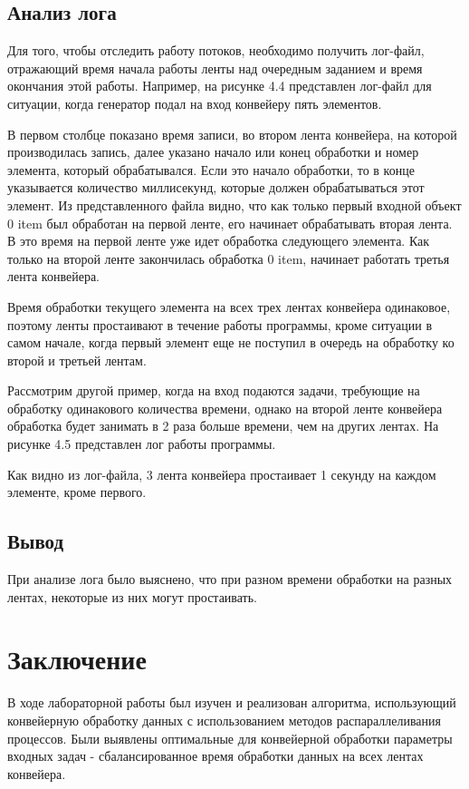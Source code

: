 \documentclass[a4paper,12pt]{report}
\begin{document}
\section{Анализ лога}

\hspace{0.6cm}Для того, чтобы отследить работу потоков, необходимо получить лог-файл, отражающий время начала работы ленты над очередным заданием и время окончания этой работы. 
Например, на рисунке 4.4 представлен лог-файл для ситуации, когда генератор подал на вход конвейеру пять элементов.



\hspace{0.6cm}В первом столбце показано время записи, во втором лента конвейера, на которой производилась запись, далее указано начало или конец обработки и номер элемента, который обрабатывался. Если это начало обработки, то в конце указывается количество миллисекунд, которые должен обрабатываться этот элемент. Из представленного файла видно, что как только первый входной объект 0 item был обработан на первой ленте, его начинает обрабатывать вторая лента. В это время на первой ленте уже идет обработка следующего элемента. Как только на второй ленте закончилась обработка 0 item, начинает работать третья лента конвейера. 

Время обработки текущего элемента на всех трех лентах конвейера одинаковое,  поэтому ленты простаивают в течение работы программы, кроме ситуации в самом начале, когда первый элемент еще не поступил в очередь на обработку ко второй и третьей лентам. 

Рассмотрим другой пример, когда на вход подаются задачи, требующие на обработку одинакового количества времени, однако на второй ленте конвейера обработка будет занимать в 2 раза больше времени, чем на других лентах. На рисунке 4.5 представлен лог работы программы.


Как видно из лог-файла, 3 лента конвейера простаивает 1 секунду на каждом элементе, кроме первого.

\section{Вывод}
\hspace{0.6cm} При анализе лога было выяснено, что при разном времени обработки на разных лентах, некоторые из них могут простаивать.

\newpage
\chapter*{Заключение}
\hspace{0.6cm}В ходе лабораторной работы был изучен и реализован алгоритма, использующий конвейерную обработку данных с использованием методов распараллеливания процессов. Были выявлены оптимальные для конвейерной обработки параметры входных задач - сбалансированное время обработки данных на всех лентах конвейера.    
\end{document}
